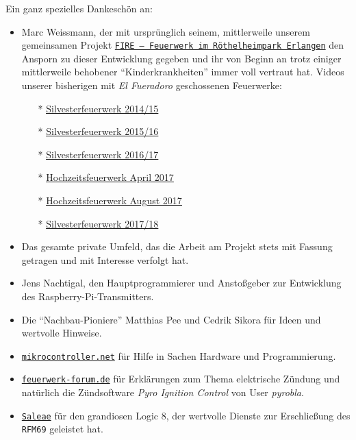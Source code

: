 \documentclass[paper=a4, parskip, numbers=noenddot, toc=listof, headsepline]{scrbook}
\newcommand{\pic}{\emph{Pyro Ignition Control}}
\newcommand{\anlage}{\emph{El Fueradoro}}
\begin{document}
		Ein ganz spezielles Dankeschön an:
		\begin{itemize}
			\item
			      Marc Weissmann, der mit ursprünglich seinem, mittlerweile unserem gemeinsamen Projekt \href{http://www.facebook.com/FIREErlangen}{\texttt{FIRE~-- Feuerwerk im Röthel\-heim\-park Er\-langen}} den Ansporn zu dieser Entwicklung gegeben und ihr von Beginn an trotz einiger mittlerweile behobener \enquote{Kinderkrankheiten} immer voll vertraut hat. Videos unserer bisherigen mit {\anlage} geschossenen Feuerwerke:
			      \begin{itemize}
				      \item[*] \underline{\href{https://vimeo.com/116115628}{Silvesterfeuerwerk 2014/15}}
				      \item[*] \underline{\href{https://vimeo.com/150594996}{Silvesterfeuerwerk 2015/16}}
				      \item[*] \underline{\href{https://vimeo.com/198168273}{Silvesterfeuerwerk 2016/17}}
				      \item[*] \underline{\href{https://www.youtube.com/watch?v=uPTW1dpsVoU}{Hochzeitsfeuerwerk April 2017}}
				      \item[*] \underline{\href{https://www.youtube.com/watch?v=q-nfOxinUgU}{Hochzeitsfeuerwerk August 2017}}
				      \item[*] \underline{\href{https://www.youtube.com/watch?v=unH9tJSg1mw}{Silvesterfeuerwerk 2017/18}}
			      \end{itemize}
			\item
			      Das gesamte private Umfeld, das die Arbeit am Projekt stets mit Fassung getragen und mit Interesse verfolgt hat.
			\item
			      Jens Nachtigal, den Hauptprogrammierer und Anstoßgeber zur Entwicklung des Raspberry-Pi-Transmitters.
			\item
			      Die \enquote{Nachbau-Pioniere} Matthias Pee und Cedrik Sikora für Ideen und wertvolle Hinweise.
			\item
			      \href{http://www.mikrocontroller.net}{\texttt{mikrocontroller.net}} für Hilfe in Sachen Hardware und Programmierung.
			\item
			      \href{http://www.feuerwerk-forum.de}{\texttt{feuerwerk-forum.de}} für Erklärungen zum Thema elektrische Zündung und natürlich die Zündsoftware {\pic} von User \emph{pyrobla}.
			\item
			      \href{http://www.saleae.com}{\texttt{Saleae}} für den grandiosen Logic 8, der wertvolle Dienste zur Erschließung des \texttt{RFM69} geleistet hat.

\end{itemize}
\end{document}
